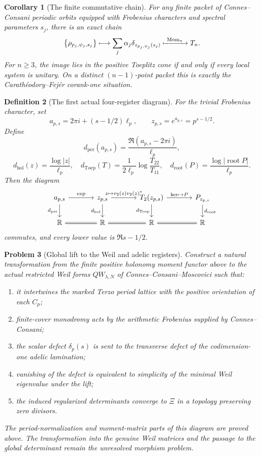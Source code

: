 \documentclass[11pt]{article}
\newtheorem{definition}{Definition}
\newtheorem{corollary}[definition]{Corollary}
\newtheorem{problem}[definition]{Problem}
\newcommand{\R}{\mathbb R}
\newcommand{\Mom}{\operatorname{Mom}}
\begin{document}
\begin{corollary}[The finite commutative chain]
For any finite packet of Connes--Consani periodic orbits equipped with Frobenius characters and spectral parameters $s_j$, there is an exact chain
\[
 \bigl\{\rho_{p_j,\psi_j,s_j}\bigr\}
 \longmapsto
 \sum_j\alpha_j\delta_{z_{p_j,\psi_j}(s_j)}
 \xmapsto{\ \Mom_n\ }
 T_n.
\]
For $n\ge3$, the image lies in the positive Toeplitz cone if and only if every local system is unitary.  On a distinct $(n-1)$-point packet this is exactly the Carath\'eodory--Fej\'er corank-one situation.
\end{corollary}

\begin{definition}[The first actual four-register diagram]
For the trivial Frobenius character, set
\[
 a_{p,s}=2\pi i+(s-1/2)\ell_p,
 \qquad
 z_{p,s}=e^{a_{p,s}}=p^{s-1/2}.
\]
Define
\[
 d_{\mathrm{per}}(a_{p,s})=\frac{\Re(a_{p,s}-2\pi i)}{\ell_p},
\]
\[
 d_{\mathrm{hol}}(z)=\frac{\log|z|}{\ell_p},
 \quad
 d_{\mathrm{Toep}}(T)=\frac1{2\ell_p}\log\frac{T_{22}}{T_{11}},
 \quad
 d_{\mathrm{root}}(P)=\frac{\log|\operatorname{root}P|}{\ell_p}.
\]
Then the diagram
\[
\begin{tikzcd}[column sep=large]
a_{p,s} \arrow[r,"\exp"] \arrow[d,"d_{\mathrm{per}}"'] &
 z_{p,s} \arrow[r,"z\mapsto v_2(z)v_2(z)^*"] \arrow[d,"d_{\mathrm{hol}}"'] &
 T_2(z_{p,s}) \arrow[r,"\ker\mapsto P"] \arrow[d,"d_{\mathrm{Toep}}"'] &
 P_{z_{p,s}} \arrow[d,"d_{\mathrm{root}}"]\\
\R \arrow[r,equal] & \R \arrow[r,equal] & \R \arrow[r,equal] & \R
\end{tikzcd}
\]
commutes, and every lower value is $\Re s-1/2$.
\end{definition}

\begin{problem}[Global lift to the Weil and adelic registers]
Construct a natural transformation from the finite positive holonomy moment functor above to the actual restricted Weil forms $QW_{\lambda,N}$ of Connes--Consani--Moscovici such that:
\begin{enumerate}[label=(\roman*)]
\item it intertwines the marked Terzo period lattice with the positive orientation of each $C_p$;
\item finite-cover monodromy acts by the arithmetic Frobenius supplied by Connes--Consani;
\item the scalar defect $\delta_p(s)$ is sent to the transverse defect of the codimension-one adelic lamination;
\item vanishing of the defect is equivalent to simplicity of the minimal Weil eigenvalue under the lift;
\item the induced regularized determinants converge to $\Xi$ in a topology preserving zero divisors.
\end{enumerate}
The period-normalization and moment-matrix parts of this diagram are proved above.  The transformation into the genuine Weil matrices and the passage to the global determinant remain the unresolved morphism problem.
\end{problem}
\end{document}
